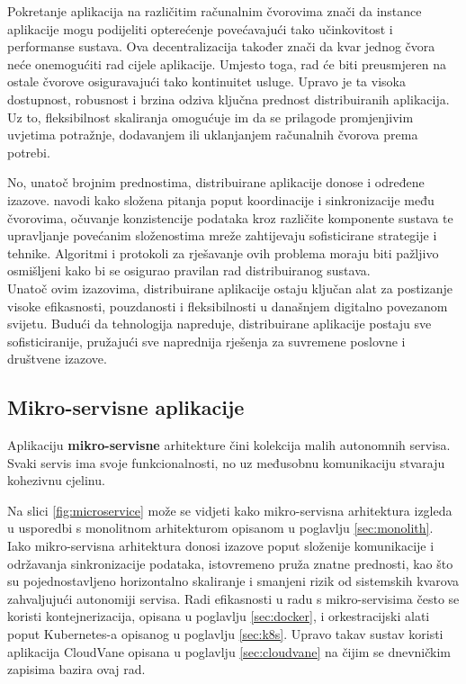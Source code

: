 \documentclass[times, utf8, diplomski]{fer}
\begin{document}
Pokretanje aplikacija na različitim računalnim čvorovima znači da instance aplikacije mogu podijeliti opterećenje povećavajući tako učinkovitost i performanse sustava. Ova decentralizacija također znači da kvar jednog čvora neće onemogućiti rad cijele aplikacije. Umjesto toga, rad će biti preusmjeren na ostale čvorove osiguravajući tako kontinuitet usluge. Upravo je ta visoka dostupnost, robusnost i brzina odziva ključna prednost distribuiranih aplikacija. Uz to, fleksibilnost skaliranja omogućuje im da se prilagode promjenjivim uvjetima potražnje, dodavanjem ili uklanjanjem računalnih čvorova prema potrebi.

No, unatoč brojnim prednostima, distribuirane aplikacije donose i određene izazove. \citet{zarko_raspodijeljeni_2013} navodi kako složena pitanja poput koordinacije i sinkronizacije među čvorovima, očuvanje konzistencije podataka kroz različite komponente sustava te upravljanje povećanim složenostima mreže zahtijevaju sofisticirane strategije i tehnike. Algoritmi i protokoli za rješavanje ovih problema moraju biti pažljivo osmišljeni kako bi se osigurao pravilan rad distribuiranog sustava. \\

Unatoč ovim izazovima, distribuirane aplikacije ostaju ključan alat za postizanje visoke efikasnosti, pouzdanosti i fleksibilnosti u današnjem digitalno povezanom svijetu. Budući da tehnologija napreduje, distribuirane aplikacije postaju sve sofisticiranije, pružajući sve naprednija rješenja za suvremene poslovne i društvene izazove.

\subsection{Mikro-servisne aplikacije}
\label{sec:microservices}

Aplikaciju \textbf{mikro-servisne} arhitekture  čini kolekcija malih autonomnih servisa. Svaki servis ima svoje funkcionalnosti, no uz međusobnu komunikaciju stvaraju kohezivnu cjelinu.

Na slici \ref{fig:microservice} može se vidjeti kako mikro-servisna arhitektura izgleda u usporedbi s monolitnom arhitekturom opisanom u poglavlju \ref{sec:monolith}. Iako mikro-servisna arhitektura donosi izazove poput složenije komunikacije i održavanja sinkronizacije podataka, istovremeno pruža znatne prednosti, kao što su pojednostavljeno horizontalno skaliranje i smanjeni rizik od sistemskih kvarova zahvaljujući autonomiji servisa.
Radi efikasnosti u radu s mikro-servisima često se koristi kontejnerizacija, opisana u poglavlju \ref{sec:docker}, i  orkestracijski alati poput Kubernetes-a opisanog u poglavlju \ref{sec:k8s}. Upravo takav sustav koristi aplikacija CloudVane opisana u poglavlju \ref{sec:cloudvane} na čijim se dnevničkim zapisima bazira ovaj rad.
\end{document}
